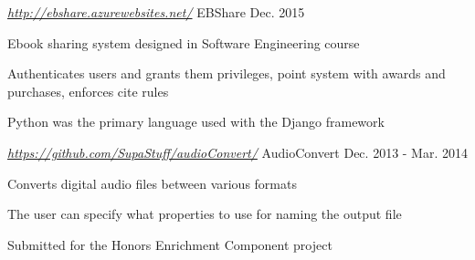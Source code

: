 \begin{cventries}
\iftrue
  \cventry
  {\textit{\url{http://ebshare.azurewebsites.net/} } }
    {EBShare}
    {Dec. 2015}
    {}
    {
      \begin{cvitems}
        \item {Ebook sharing system designed in Software Engineering course}
        \item {Authenticates users and grants them privileges, point system with awards and purchases, enforces cite rules}
        \item {Python was the primary language used with the Django framework}
      \end{cvitems}
    }
\fi
\iffalse
  \cventry
  {\textit{\url{http://www.mariamiamaya.com/} } }
    {Maya's Cooking with Love}
    {July 2015 - Sep. 2015}
    {}
    {
      \begin{cvitems}
        \item {Website for Maria Maya, an Christian author who wishes to share
		  her love for cooking}
        \item {Styled using responsive CSS to accommodate various screen sizes}
        \item {The site features an introduction page, a few sample recipe
		  pages, and a contact page}
      \end{cvitems}
    }
\fi
\iffalse
  \cventry
  {\textit{\url{http://supastuff.github.io/nycHSdir/} } }
    {MyFutureHS}
    {July 2014 - Nov. 2014}
    {}
    {
      \begin{cvitems}
        \item {Searches for High Schools by various criteria such as academics, location, programs, and demographics}
        \item {Visualizes results on the map in the background}
        \item {Creates a report of selected schools’ statistics}
      \end{cvitems}
    }
\fi
\iffalse
  \cventry
  {\textit{\url{https://github.com/SupaStuff/audioConvert/} } }
    {AudioConvert}
    {Dec. 2013 - Mar. 2014}
    {}
    {
      \begin{cvitems}
        \item {Converts digital audio files between various formats}
        \item {The user can specify what properties to use for naming the output file}
        \item {Submitted for the Honors Enrichment Component project}

\end{cvitems}}
\end{cventries}

